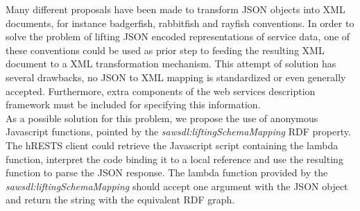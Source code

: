 Many different proposals have been made to transform JSON objects into XML documents, for instance badgerfish, rabbitfish and rayfish conventions. In order to solve the problem of lifting JSON encoded representations of service data, one of these conventions could be used as prior step to feeding the resulting XML document to a XML transformation mechanism. This attempt of solution has several drawbacks, no JSON to XML mapping is standardized or even generally accepted. Furthermore, extra components of the web services description framework must be included for specifying this information.\\
As a possible solution for this problem, we propose the use of anonymous Javascript functions, pointed by the \emph{sawsdl:liftingSchemaMapping} RDF property. The hRESTS client could retrieve the Javascript script containing the lambda function, interpret the code binding it to a local reference and use the resulting function to parse the JSON response. The lambda function provided by the \emph{sawsdl:liftingSchemaMapping} should accept one argument with the JSON object and return the string with the equivalent RDF graph.

